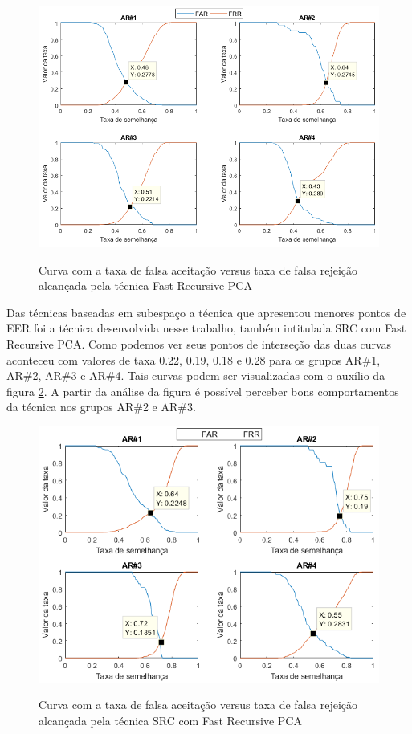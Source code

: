 \begin{figure}[H]
\centering
\caption{Curva com a taxa de falsa aceitação versus taxa de falsa rejeição alcançada pela técnica Fast Recursive PCA}
\includegraphics[scale=0.55]{imgs4/graficos_FAR_FRR/FastRecPCA}
\label{fig:FAR_FRR_Fast_Rec_PCA}
\end{figure}

Das técnicas baseadas em subespaço a técnica que apresentou menores pontos de EER foi a técnica desenvolvida nesse trabalho, também intitulada SRC com Fast Recursive PCA. Como podemos ver seus pontos de interseção das duas curvas aconteceu com valores de taxa 0.22, 0.19, 0.18 e 0.28 para os grupos AR\#1, AR\#2, AR\#3 e AR\#4. Tais curvas podem ser visualizadas com o auxílio da figura \ref{fig:FAR_FRR_SRC_Fast_Rec_pca}. A partir da análise da figura é possível perceber bons comportamentos da técnica nos grupos AR\#2 e AR\#3.

\begin{figure}[H]
\centering
\caption{Curva com a taxa de falsa aceitação versus taxa de falsa rejeição alcançada pela técnica SRC com Fast Recursive PCA}
\includegraphics[scale=0.60]{imgs4/graficos_FAR_FRR/src_recPca}
\label{fig:FAR_FRR_SRC_Fast_Rec_pca}
\end{figure}


